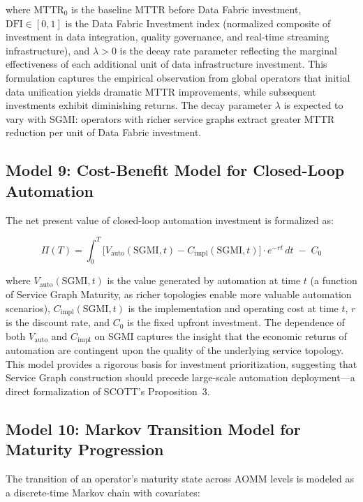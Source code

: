 \documentclass[12pt,a4paper]{article}
\begin{document}
\noindent where $\text{MTTR}_0$ is the baseline MTTR before Data Fabric investment, $\text{DFI} \in [0, 1]$ is the Data Fabric Investment index (normalized composite of investment in data integration, quality governance, and real-time streaming infrastructure), and $\lambda > 0$ is the decay rate parameter reflecting the marginal effectiveness of each additional unit of data infrastructure investment. This formulation captures the empirical observation from global operators that initial data unification yields dramatic MTTR improvements, while subsequent investments exhibit diminishing returns. The decay parameter $\lambda$ is expected to vary with SGMI: operators with richer service graphs extract greater MTTR reduction per unit of Data Fabric investment.

\subsection{Model 9: Cost-Benefit Model for Closed-Loop Automation}

The net present value of closed-loop automation investment is formalized as:

\begin{equation}
\Pi(T) = \int_0^T \bigl[V_{\text{auto}}(\text{SGMI}, t) - C_{\text{impl}}(\text{SGMI}, t)\bigr] \cdot e^{-rt}\, dt \;-\; C_0
\label{eq:costbenefit}
\end{equation}

\noindent where $V_{\text{auto}}(\text{SGMI}, t)$ is the value generated by automation at time $t$ (a function of Service Graph Maturity, as richer topologies enable more valuable automation scenarios), $C_{\text{impl}}(\text{SGMI}, t)$ is the implementation and operating cost at time $t$, $r$ is the discount rate, and $C_0$ is the fixed upfront investment. The dependence of both $V_{\text{auto}}$ and $C_{\text{impl}}$ on SGMI captures the insight that the economic returns of automation are contingent upon the quality of the underlying service topology. This model provides a rigorous basis for investment prioritization, suggesting that Service Graph construction should precede large-scale automation deployment---a direct formalization of SCOTT's Proposition~3.

\subsection{Model 10: Markov Transition Model for Maturity Progression}

The transition of an operator's maturity state across AOMM levels is modeled as a discrete-time Markov chain with covariates:
\end{document}

